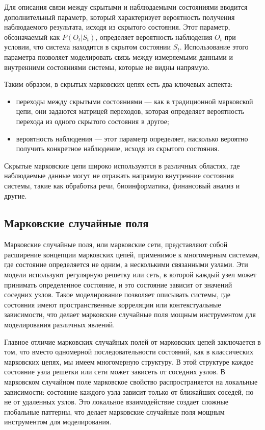 Для описания связи между скрытыми и наблюдаемыми состояниями вводится дополнительный параметр, который характеризует вероятность получения наблюдаемого результата, исходя из скрытого состояния. Этот параметр, обозначаемый как $P(O_t | S_t)$, определяет вероятность наблюдения $O_t$ при условии, что система находится в скрытом состоянии $S_t$. Использование этого параметра позволяет моделировать связь между измеряемыми данными и внутренними состояниями системы, которые не видны напрямую.

Таким образом, в скрытых марковских цепях есть два ключевых аспекта:

\begin{itemize}
	\item переходы между скрытыми состояниями — как в традиционной марковской цепи, они задаются матрицей переходов, которая определяет вероятность перехода из одного скрытого состояния в другое;
	\item вероятность наблюдения — этот параметр определяет, насколько вероятно получить конкретное наблюдение, исходя из скрытого состояния.
\end{itemize}

Скрытые марковские цепи широко используются в различных областях, где наблюдаемые данные могут не отражать напрямую внутренние состояния системы, такие как обработка речи, биоинформатика, финансовый анализ и другие.




\subsection{Марковские случайные поля}


Марковские случайные поля, или марковские сети, представляют собой расширение концепции марковских цепей, применимое к многомерным системам, где состояние определяется не одним, а несколькими связанными узлами. Эти модели используют регулярную решетку или сеть, в которой каждый узел может принимать определенное состояние, и это состояние зависит от значений соседних узлов. Такое моделирование позволяет описывать системы, где состояния имеют пространственные корреляции или контекстуальные зависимости, что делает марковские случайные поля мощным инструментом для моделирования различных явлений.

Главное отличие марковских случайных полей от марковских цепей заключается в том, что вместо одномерной последовательности состояний, как в классических марковских цепях, мы имеем многомерную структуру. В этой структуре каждое состояние узла решетки или сети может зависеть от соседних узлов. В марковском случайном поле марковское свойство распространяется на локальные зависимости: состояние каждого узла зависит только от ближайших соседей, но не от удаленных узлов. Это локальное взаимодействие создает сложные глобальные паттерны, что делает марковские случайные поля мощным инструментом для моделирования.

